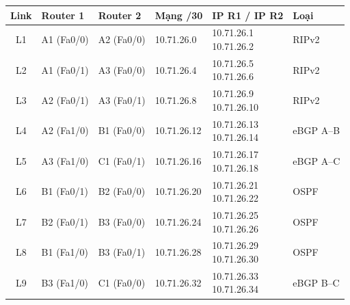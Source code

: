 \vspace{0.2cm}

\begin{table}[H]
\centering
\scriptsize
\renewcommand{\arraystretch}{1.5}
\setlength{\extrarowheight}{3pt}
\setlength{\tabcolsep}{3pt}

\begin{tabularx}{\textwidth}{
|c|l|l|l|>{\raggedright\arraybackslash}X|l|
}
\hline

\textbf{Link} &
\textbf{Router 1} &
\textbf{Router 2} &
\textbf{Mạng /30} &
\textbf{IP R1 / IP R2} &
\textbf{Loại} \\
\hline

L1 &
A1 (Fa0/0) &
A2 (Fa0/0) &
10.71.26.0 &
\makecell[l]{10.71.26.1\\10.71.26.2} &
RIPv2 \\
\hline

L2 &
A1 (Fa0/1) &
A3 (Fa0/0) &
10.71.26.4 &
\makecell[l]{10.71.26.5\\10.71.26.6} &
RIPv2 \\
\hline

L3 &
A2 (Fa0/1) &
A3 (Fa0/1) &
10.71.26.8 &
\makecell[l]{10.71.26.9\\10.71.26.10} &
RIPv2 \\
\hline

L4 &
A2 (Fa1/0) &
B1 (Fa0/0) &
10.71.26.12 &
\makecell[l]{10.71.26.13\\10.71.26.14} &
eBGP A--B \\
\hline

L5 &
A3 (Fa1/0) &
C1 (Fa0/1) &
10.71.26.16 &
\makecell[l]{10.71.26.17\\10.71.26.18} &
eBGP A--C \\
\hline

L6 &
B1 (Fa0/1) &
B2 (Fa0/0) &
10.71.26.20 &
\makecell[l]{10.71.26.21\\10.71.26.22} &
OSPF \\
\hline

L7 &
B2 (Fa0/1) &
B3 (Fa0/0) &
10.71.26.24 &
\makecell[l]{10.71.26.25\\10.71.26.26} &
OSPF \\
\hline

L8 &
B1 (Fa1/0) &
B3 (Fa0/1) &
10.71.26.28 &
\makecell[l]{10.71.26.29\\10.71.26.30} &
OSPF \\
\hline

L9 &
B3 (Fa1/0) &
C1 (Fa0/0) &
10.71.26.32 &
\makecell[l]{10.71.26.33\\10.71.26.34} &
eBGP B--C \\
\hline


\end{tabularx}
\end{table}
